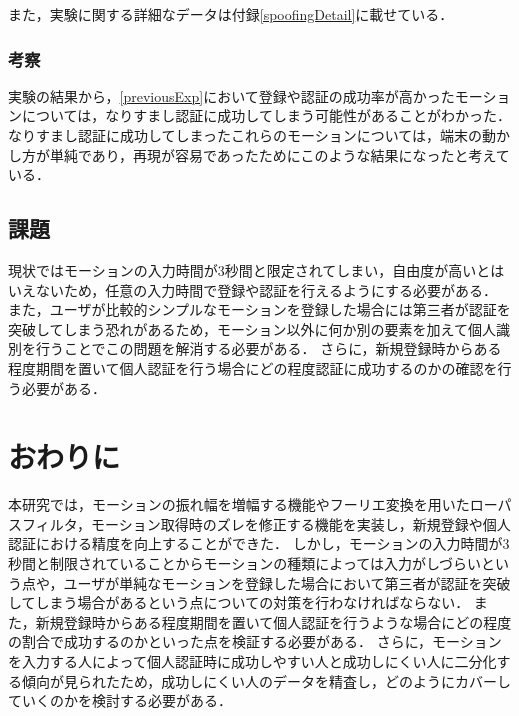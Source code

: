 \documentclass[11pt]{jreport}
\begin{document}
    また，実験に関する詳細なデータは付録\ref{spoofingDetail}に載せている．

    \subsection{考察}
    実験の結果から，\ref{previousExp}において登録や認証の成功率が高かったモーションについては，なりすまし認証に成功してしまう可能性があることがわかった．
    なりすまし認証に成功してしまったこれらのモーションについては，端末の動かし方が単純であり，再現が容易であったためにこのような結果になったと考えている．

    \section{課題} %
    現状ではモーションの入力時間が3秒間と限定されてしまい，自由度が高いとはいえないため，任意の入力時間で登録や認証を行えるようにする必要がある．
    また，ユーザが比較的シンプルなモーションを登録した場合には第三者が認証を突破してしまう恐れがあるため，モーション以外に何か別の要素を加えて個人識別を行うことでこの問題を解消する必要がある．
    さらに，新規登録時からある程度期間を置いて個人認証を行う場合にどの程度認証に成功するのかの確認を行う必要がある．

\chapter{おわりに} %
本研究では，モーションの振れ幅を増幅する機能やフーリエ変換を用いたローパスフィルタ，モーション取得時のズレを修正する機能を実装し，新規登録や個人認証における精度を向上することができた．
しかし，モーションの入力時間が3秒間と制限されていることからモーションの種類によっては入力がしづらいという点や，ユーザが単純なモーションを登録した場合において第三者が認証を突破してしまう場合があるという点についての対策を行わなければならない．
また，新規登録時からある程度期間を置いて個人認証を行うような場合にどの程度の割合で成功するのかといった点を検証する必要がある．
さらに，モーションを入力する人によって個人認証時に成功しやすい人と成功しにくい人に二分化する傾向が見られたため，成功しにくい人のデータを精査し，どのようにカバーしていくのかを検討する必要がある．
\end{document}
